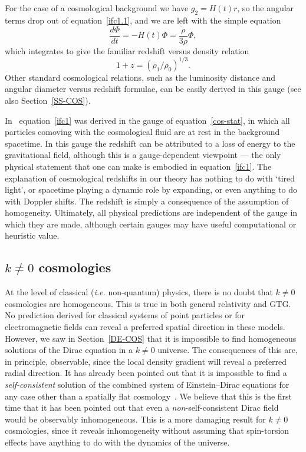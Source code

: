 \documentclass[a4paper]{article}
\numberwithin{equation}{section}
\newcommand{\rhodot}{\dot{\rho}}
\begin{document}
For the case of a cosmological background we have $g_2 = H(t) r$, so
the angular terms drop out of equation~\eqref{ifc1.1}, and we are left
with the simple equation
%
\begin{equation}
\frac{d\Phi}{dt} = - H(t) \Phi = \frac{\rhodot}{3\rho} \Phi,
\end{equation}
%
which integrates to give the familiar redshift versus density relation
%
\begin{equation}
1 + z = (\rho_1/\rho_0)^{1/3}.
\label{ifc1}
\end{equation}
%
Other standard cosmological relations, such as the luminosity distance
and angular diameter versus redshift formulae, can be easily derived
in this gauge (see also Section~\ref{SS-COS}). 


In~\cite{DGL-cosm-bel} equation~\eqref{ifc1} was derived in the gauge of
equation~\eqref{cos-stat}, in which all particles comoving with the
cosmological fluid are at rest in the background spacetime.  In this
gauge the redshift can be attributed to a loss of energy to the
gravitational field, although this is a gauge-dependent viewpoint ---
the only physical statement that one can make is embodied in
equation~\eqref{ifc1}.  The explanation of cosmological redshifts in our
theory has nothing to do with `tired light', or spacetime playing a
dynamic role by expanding, or even anything to do with Doppler shifts.
The redshift is simply a consequence of the assumption of homogeneity.
Ultimately, all physical predictions are independent of the gauge in
which they are made, although certain gauges may have useful
computational or heuristic value.


\subsection[$k\neq 0$ cosmologies]{{\boldmath $k\neq 0$} cosmologies} 

At the level of classical (\textit{i.e.} non-quantum) physics, there
is no doubt that $k\neq 0$ cosmologies are homogeneous.  This is true
in both general relativity and GTG.  No prediction derived for
classical systems of point particles or for electromagnetic fields can
reveal a preferred spatial direction in these models.  However, we saw
in Section~\ref{DE-COS} that it is impossible to find homogeneous
solutions of the Dirac equation in a $k\neq 0$ universe.  The
consequences of this are, in principle, observable, since the local
density gradient will reveal a preferred radial direction.  It has
already been pointed out that it is impossible to find a
\textit{self-consistent} solution of the combined system of
Einstein--Dirac equations for any case other than a spatially flat
cosmology~\cite{DGL-cosm-bel,ish74}.  We believe that this is the
first time that it has been pointed out that even a {\em
non}-self-consistent Dirac field would be observably inhomogeneous.
This is a more damaging result for $k\neq 0$ cosmologies, since it
reveals inhomogeneity without assuming that spin-torsion effects have
anything to do with the dynamics of the universe.
\end{document}
